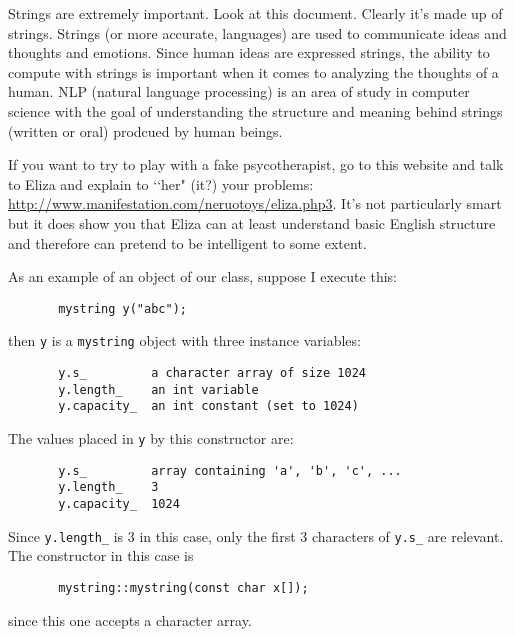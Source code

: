 Strings are extremely important. Look at this document.
Clearly it's made up of strings. Strings (or more
accurate, languages) are used to communicate ideas and thoughts and emotions.
Since human ideas are expressed
strings, the ability to compute with strings is important when it comes to
analyzing the thoughts of a
human. NLP (natural language processing) is an area of study in computer
science with the goal of
understanding the structure and meaning behind strings (written or oral)
prodcued by human beings.

If you want to try to play with a fake psycotherapist, go to this website and
talk to Eliza and explain to
\lq\lq her" (it?) your problems:
\underline{http://www.manifestation.com/neruotoys/eliza.php3}.
It's not particularly smart
but it does show you that Eliza can at least understand basic English
structure and therefore can
pretend to be intelligent to some extent.

As an example of an object of our class, suppose I execute this:
{\small
\begin{Verbatim}
       mystring y("abc");
\end{Verbatim}
}
then \verb!y! is a \verb!mystring! object with three instance variables:
{\small
\begin{Verbatim}
       y.s_         a character array of size 1024
       y.length_    an int variable
       y.capacity_  an int constant (set to 1024)
\end{Verbatim}
}
The values placed in \verb!y! by this constructor are:
{\small
\begin{Verbatim}
       y.s_         array containing 'a', 'b', 'c', ...
       y.length_    3
       y.capacity_  1024
\end{Verbatim}
}
Since \verb!y.length_! is 3 in this case, only the first 3 characters of
\verb!y.s_! are relevant. The constructor in
this case is
{\small
\begin{Verbatim}
       mystring::mystring(const char x[]);
\end{Verbatim}
}
since this one accepts a character array.

